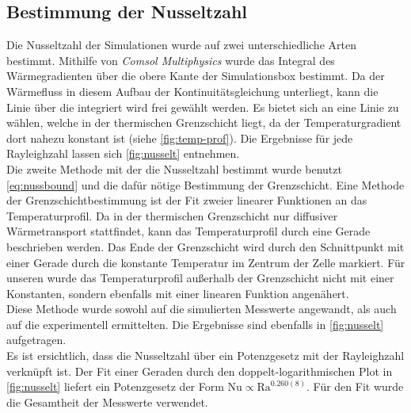\subsection{Bestimmung der Nusseltzahl}
Die Nusseltzahl der Simulationen wurde auf zwei unterschiedliche Arten bestimmt. 
Mithilfe von \emph{Comsol Multiphysics} wurde das Integral des Wärmegradienten über die obere Kante der Simulationsbox bestimmt.
Da der Wärmefluss in diesem Aufbau der Kontinuitätsgleichung unterliegt, kann die Linie über die integriert wird frei gewählt werden. 
Es bietet sich an eine Linie zu wählen, welche in der thermischen Grenzschicht liegt, da der Temperaturgradient dort nahezu konstant ist (siehe \cref{fig:temp-prof}).
Die Ergebnisse für jede Rayleighzahl lassen sich \cref{fig:nusselt} entnehmen. 
\\
Die zweite Methode mit der die Nusseltzahl bestimmt wurde benutzt \cref{eq:nussbound} und die dafür nötige Bestimmung der Grenzschicht. 
Eine Methode der Grenzschichtbestimmung ist der Fit zweier linearer Funktionen an das Temperaturprofil. Da in der thermischen Grenzschicht nur diffusiver Wärmetransport stattfindet, kann das Temperaturprofil durch eine Gerade beschrieben werden.
Das Ende der Grenzschicht wird durch den Schnittpunkt mit einer Gerade durch die konstante Temperatur im Zentrum der Zelle markiert. 
Für unseren wurde das Temperaturprofil außerhalb der Grenzschicht nicht mit einer Konstanten, sondern ebenfalls mit einer linearen Funktion angenähert.
\\
Diese Methode wurde sowohl auf die simulierten Messwerte angewandt, als auch auf die experimentell ermittelten. Die Ergebnisse sind ebenfalls in \cref{fig:nusselt} aufgetragen.
\\
Es ist ersichtlich, dass die Nusseltzahl über ein Potenzgesetz mit der Rayleighzahl verknüpft ist. Der Fit einer Geraden durch den doppelt-logarithmischen Plot in \cref{fig:nusselt} liefert ein Potenzgesetz der Form $\text{Nu} \propto \text{Ra}^{0.260(8)}$.
Für den Fit wurde die Gesamtheit der Messwerte verwendet.
